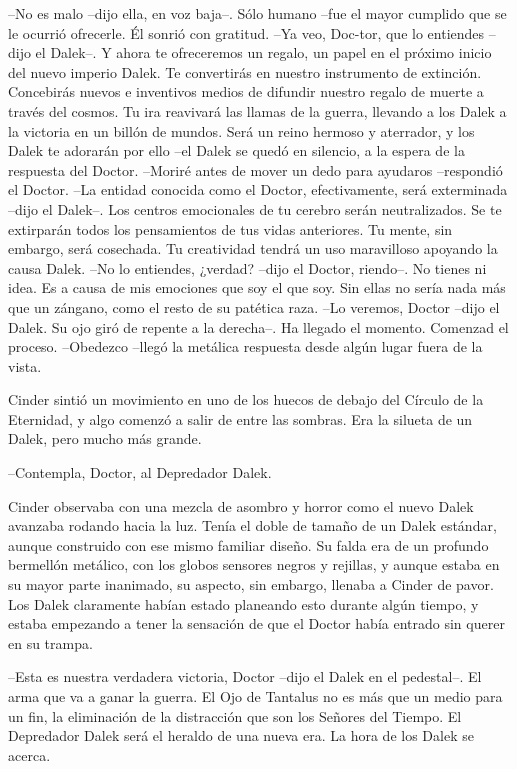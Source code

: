 --No es malo --dijo ella, en voz baja--. Sólo humano --fue el mayor cumplido que se le ocurrió ofrecerle. Él sonrió con gratitud.
--Ya veo, Doc-tor, que lo entiendes --dijo el Dalek--. Y ahora te ofreceremos un regalo, un papel en el próximo inicio del nuevo imperio Dalek. Te convertirás en nuestro instrumento de extinción. Concebirás nuevos e inventivos medios de difundir nuestro regalo de muerte a través del cosmos. Tu ira reavivará las llamas de la guerra, llevando a los Dalek a la victoria en un billón de mundos. Será un reino hermoso y aterrador, y los Dalek te adorarán por ello --el Dalek se quedó en silencio, a la espera de la respuesta del Doctor.
--Moriré antes de mover un dedo para ayudaros --respondió el Doctor.
--La entidad conocida como el Doctor, efectivamente, será exterminada --dijo el Dalek--. Los centros emocionales de tu cerebro serán neutralizados. Se te extirparán todos los pensamientos de tus vidas anteriores. Tu mente, sin embargo, será cosechada. Tu creatividad tendrá un uso maravilloso apoyando la causa Dalek.
--No lo entiendes, ¿verdad? --dijo el Doctor, riendo--. No tienes ni idea. Es a causa de mis emociones que soy el que soy. Sin ellas no sería nada más que un zángano, como el resto de su patética raza.
--Lo veremos, Doctor --dijo el Dalek. Su ojo giró de repente a la derecha--. Ha llegado el momento. Comenzad el proceso.
--Obedezco --llegó la metálica respuesta desde algún lugar fuera de la vista.

Cinder sintió un movimiento en uno de los huecos de debajo del Círculo de la Eternidad, y algo comenzó a salir de entre las sombras. Era la silueta de un Dalek, pero mucho más grande.

--Contempla, Doctor, al Depredador Dalek.

Cinder observaba con una mezcla de asombro y horror como el nuevo Dalek avanzaba rodando hacia la luz. Tenía el doble de tamaño de un Dalek estándar, aunque construido con ese mismo familiar diseño. Su falda era de un profundo bermellón metálico, con los globos sensores negros y rejillas, y aunque estaba en su mayor parte inanimado, su aspecto, sin embargo, llenaba a Cinder de pavor. Los Dalek claramente habían estado planeando esto durante algún tiempo, y estaba empezando a tener la sensación de que el Doctor había entrado sin querer en su trampa.

--Esta es nuestra verdadera victoria, Doctor --dijo el Dalek en el pedestal--. El arma que va a ganar la guerra. El Ojo de Tantalus no es más que un medio para un fin, la eliminación de la distracción que son los Señores del Tiempo. El Depredador Dalek será el heraldo de una nueva era. La hora de los Dalek se acerca.

